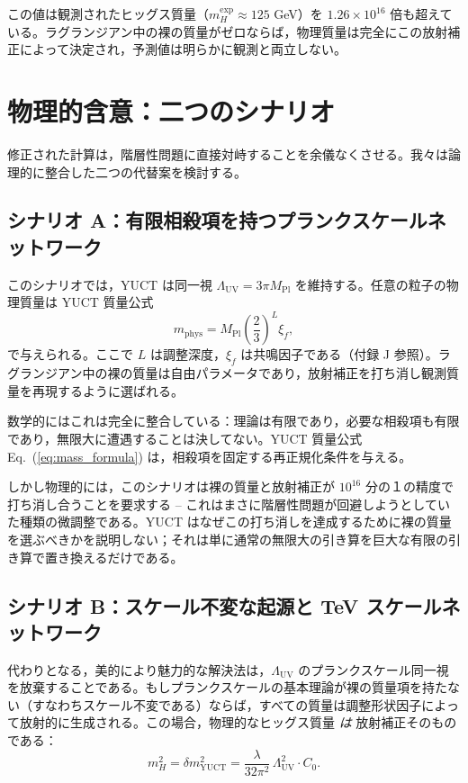\documentclass[11pt,a4paper]{article}
\newcommand{\Mpl}{M_{\mathrm{Pl}}}
\newcommand{\LUV}{\Lambda_{\mathrm{UV}}}
\theoremstyle{remark}
\begin{document}
	この値は観測されたヒッグス質量（\(m_H^{\mathrm{exp}} \approx 125\) GeV）を \(1.26 \times 10^{16}\) 倍も超えている。ラグランジアン中の裸の質量がゼロならば，物理質量は完全にこの放射補正によって決定され，予測値は明らかに観測と両立しない。
	
	\section{物理的含意：二つのシナリオ}
	\label{sec:scenarios}
	
	修正された計算は，階層性問題に直接対峙することを余儀なくさせる。我々は論理的に整合した二つの代替案を検討する。
	
	\subsection{シナリオ A：有限相殺項を持つプランクスケールネットワーク}
	
	このシナリオでは，YUCT は同一視 \(\LUV = 3\pi\Mpl\) を維持する。任意の粒子の物理質量は YUCT 質量公式
	\begin{equation}
		m_{\mathrm{phys}} = \Mpl \left(\frac{2}{3}\right)^L \xi_f,
		\label{eq:mass_formula}
	\end{equation}
	で与えられる。ここで \(L\) は調整深度，\(\xi_f\) は共鳴因子である（付録 J 参照）。ラグランジアン中の裸の質量は自由パラメータであり，放射補正を打ち消し観測質量を再現するように選ばれる。
	
	数学的にはこれは完全に整合している：理論は有限であり，必要な相殺項も有限であり，無限大に遭遇することは決してない。YUCT 質量公式 Eq.~(\ref{eq:mass_formula}) は，相殺項を固定する再正規化条件を与える。
	
	しかし物理的には，このシナリオは裸の質量と放射補正が \(10^{16}\) 分の１の精度で打ち消し合うことを要求する – これはまさに階層性問題が回避しようとしていた種類の微調整である。YUCT はなぜこの打ち消しを達成するために裸の質量を選ぶべきかを説明しない；それは単に通常の無限大の引き算を巨大な有限の引き算で置き換えるだけである。
	
	\subsection{シナリオ B：スケール不変な起源と TeV スケールネットワーク}
	
	代わりとなる，美的により魅力的な解決法は，\(\LUV\) のプランクスケール同一視を放棄することである。もしプランクスケールの基本理論が裸の質量項を持たない（すなわちスケール不変である）ならば，すべての質量は調整形状因子によって放射的に生成される。この場合，物理的なヒッグス質量 \emph{は} 放射補正そのものである：
	\begin{equation}
		m_H^2 = \delta m^2_{\mathrm{YUCT}} = \frac{\lambda}{32\pi^2}\,\LUV^2 \cdot C_0.
		\label{eq:scale_inv}
	\end{equation}
	
\end{document}
